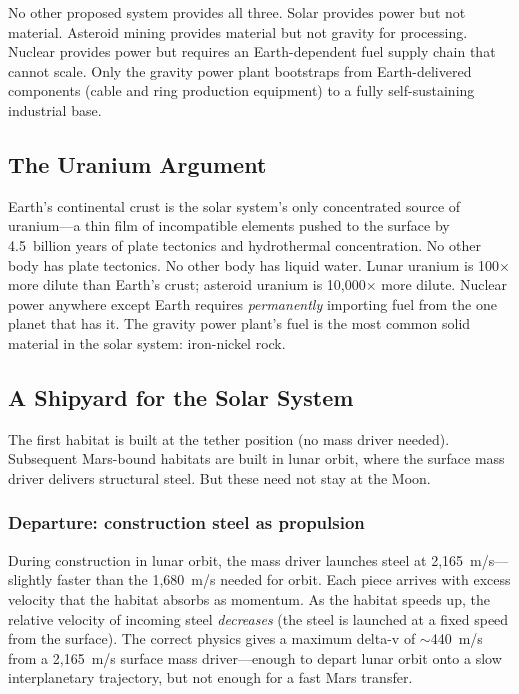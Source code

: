 \documentclass[12pt,letterpaper]{article}
\begin{document}
No other proposed system provides all three. Solar provides power but not material. Asteroid mining provides material but not gravity for processing. Nuclear provides power but requires an Earth-dependent fuel supply chain that cannot scale. Only the gravity power plant bootstraps from Earth-delivered components (cable and ring production equipment) to a fully self-sustaining industrial base.

\subsection{The Uranium Argument}

Earth's continental crust is the solar system's only concentrated source of uranium---a thin film of incompatible elements pushed to the surface by 4.5~billion years of plate tectonics and hydrothermal concentration. No other body has plate tectonics. No other body has liquid water. Lunar uranium is 100$\times$ more dilute than Earth's crust; asteroid uranium is 10,000$\times$ more dilute. Nuclear power anywhere except Earth requires \emph{permanently} importing fuel from the one planet that has it. The gravity power plant's fuel is the most common solid material in the solar system: iron-nickel rock.

\subsection{A Shipyard for the Solar System}

The first habitat is built at the tether position (no mass driver needed). Subsequent Mars-bound habitats are built in lunar orbit, where the surface mass driver delivers structural steel. But these need not stay at the Moon.

\subsubsection{Departure: construction steel as propulsion}\label{sec:mars_departure}

During construction in lunar orbit, the mass driver launches steel at 2,165~m/s---slightly faster than the 1,680~m/s needed for orbit. Each piece arrives with excess velocity that the habitat absorbs as momentum. As the habitat speeds up, the relative velocity of incoming steel \emph{decreases} (the steel is launched at a fixed speed from the surface). The correct physics gives a maximum delta-v of $\sim$440~m/s from a 2,165~m/s surface mass driver---enough to depart lunar orbit onto a slow interplanetary trajectory, but not enough for a fast Mars transfer.
\end{document}
